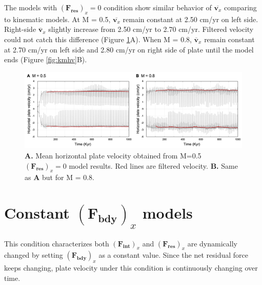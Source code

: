\documentclass[letterpaper,12pt,notitle]{memphisthesis}                     %
\begin{document}
The models with $(\boldsymbol{F_{res}})_x=0$ condition show similar behavior of $\overline{\boldsymbol{v}_x}$ comparing to kinematic models. At M = 0.5, $\overline{\boldsymbol{v}_x}$ remain constant at 2.50 cm/yr on left side. Right-side $\overline{\boldsymbol{v}}_{x}$ slightly increase from 2.50 cm/yr to 2.70 cm/yr. Filtered velocity could not catch this difference (Figure \ref{fig:f0mhv}A). 
When M = 0.8, $\overline{\boldsymbol{v}}_{x}$ remain constant at 2.70 cm/yr on left side and 2.80 cm/yr on right side of plate until the model ends (Figure \ref{fig:kmhv}B).
%
\begin{figure}[!htb]
	\centering
	\includegraphics[width=0.98\linewidth]{./figs/f0mhv.png}
	\caption{\textbf{A.} Mean horizontal plate velocity obtained from M=0.5 $(\boldsymbol{F_{res}})_x=0$ model results. Red lines are filtered velocity. \textbf{B.} Same as \textbf{A} but for M = 0.8. }
	\label{fig:f0mhv}
\end{figure}

\section{Constant $(\boldsymbol{F_{bdy}})_x$ models}

This condition characterizes both $(\boldsymbol{F_{int}})_x$ and $(\boldsymbol{F_{res}})_x$ are dynamically changed by setting $(\boldsymbol{F_{bdy}})_x$ as a constant value. Since the net residual force keeps changing, plate velocity under this condition is continuously changing over time.
\end{document}

